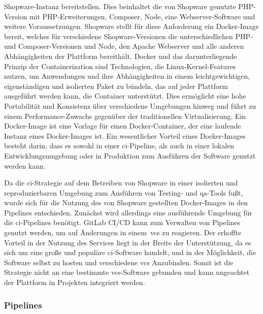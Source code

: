 Shopware-Instanz bereitstellen.
Dies beinhaltet die von Shopware genutzte PHP-Version mit PHP-Erweiterungen, Composer, Node, eine
Webserver-Software und weitere Voraussetzungen.
Shopware stellt für diese Anforderung ein Docker-Image bereit, welches für verschiedene Shopware-Versionen
die unterschiedlichen PHP- und Composer-Versionen und Node, den Apache Webserver und alle anderen Abhängigkeiten
der Plattform bereithält.
Docker und das darunterliegende Prinzip der Containerization sind Technologien, die Linux-Kernel-Features nutzen, um
Anwendungen und ihre Abhängigkeiten in einem leichtgewichtigen, eigenständigen und isolierten Paket zu bündeln, das auf
jeder Plattform ausgeführt werden kann, die Container unterstützt.
Dies ermöglicht eine hohe Portabilität und Konsistenz über verschiedene Umgebungen hinweg und führt zu einem
Performance-Zuwachs gegenüber der traditionellen Virtualisierung.
Ein Docker-Image ist eine Vorlage für einen Docker-Container, der eine laufende Instanz eines Docker-Images ist.
Ein wesentlicher Vorteil eines Docker-Images besteht darin, dass es sowohl in einer \acrshort{ci}-Pipeline, als auch in
einer lokalen Entwicklungsumgebung oder in Produktion zum Ausführen der Software genutzt werden kann.

Da die \acrshort{ci}-Strategie auf dem Betreiben von Shopware in einer isolierten und reproduzierbaren Umgebung zum
Ausführen von Testing- und \acrshort{qa}-Tools fußt, wurde sich für die Nutzung des von Shopware gestellten
Docker-Images in den Pipelines entschieden.
Zunächst wird allerdings eine ausführende Umgebung für die \acrshort{ci}-Pipelines benötigt.
GitLab CI/CD kann zum Verwalten von Pipelines genutzt werden, um auf Änderungen in einem\ \acrshort{vcs} zu reagieren.
Der erhoffte Vorteil in der Nutzung des Services liegt in der Breite der Unterstützung, da es sich um eine große und
populäre \acrshort{ci}-Software handelt, und in der Möglichkeit, die Software selbst zu hosten und verschiedene
\acrshort{vcs} Anzubinden.
Somit ist die Strategie nicht an eine bestimmte \acrshort{vcs}-Software gebunden und kann ungeachtet der Plattform in
Projekten integriert werden.

\subsubsection{Pipelines}

